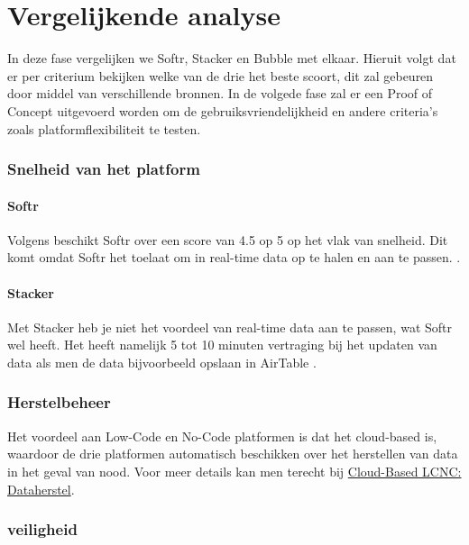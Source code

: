 \section*{Vergelijkende analyse}
\label{sec:vergelijkende-analyse} 
In deze fase vergelijken we Softr, Stacker en Bubble met elkaar.
Hieruit volgt dat er per criterium bekijken welke van de drie het beste scoort, dit zal gebeuren door middel van verschillende bronnen.
In de volgede fase zal er een Proof of Concept uitgevoerd worden om de gebruiksvriendelijkheid en andere criteria's zoals platformflexibiliteit te testen.

\subsubsection*{Snelheid van het platform}
\paragraph{Softr}
Volgens \textcite{Code2023} 
beschikt Softr over een score van 4.5 op 5 op het vlak van snelheid. 
Dit komt omdat Softr het toelaat om in real-time data op te halen en aan te passen. \autocite{Youssef2023}.
\paragraph{Stacker}
Met Stacker heb je niet het voordeel van real-time data aan te passen, wat Softr wel heeft.
 Het heeft namelijk 5 tot 10 minuten vertraging bij het updaten van data als men de data bijvoorbeeld opslaan in AirTable \autocite{Youssef2023}.
\subsubsection*{Herstelbeheer}
Het voordeel aan Low-Code en No-Code platformen is dat het cloud-based is, waardoor de drie platformen automatisch beschikken over het herstellen van data in het geval van nood. 
Voor meer details kan men terecht bij \hyperref[subsec:cloud-based-lcnc]{Cloud-Based LCNC: Dataherstel}.
\subsubsection*{veiligheid}
